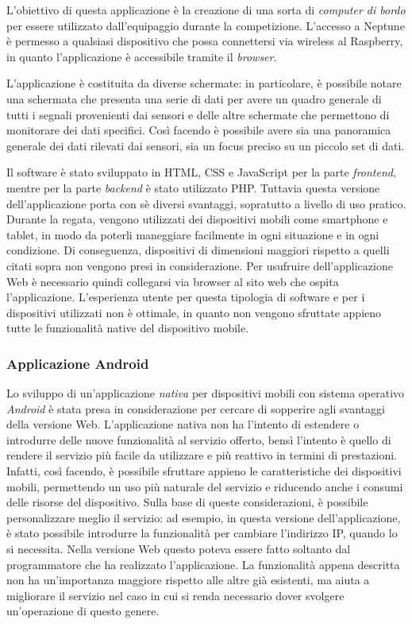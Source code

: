 L'obiettivo di questa applicazione è la creazione di una sorta di \textit{computer di bordo} per essere utilizzato dall'equipaggio durante la competizione. L'accesso a Neptune è permesso a qualsiasi dispositivo che possa connettersi via wireless al Raspberry, in quanto l'applicazione è accessibile tramite il \textit{browser}.

L'applicazione è costituita da diverse schermate: in particolare, è possibile notare una schermata che presenta una serie di dati per avere un quadro generale di tutti i segnali provenienti dai sensori e delle altre schermate che permettono di monitorare dei dati specifici. Così facendo è possibile avere sia una panoramica generale dei dati rilevati dai sensori, sia un focus preciso su un piccolo set di dati.

Il software è stato sviluppato in HTML, CSS e JavaScript per la parte \textit{frontend}, mentre per la parte \textit{backend} è stato utilizzato PHP. Tuttavia questa versione dell'applicazione porta con sè diversi svantaggi, sopratutto a livello di uso pratico. Durante la regata, vengono utilizzati dei dispositivi mobili come smartphone e tablet, in modo da poterli maneggiare facilmente in ogni situazione e in ogni condizione. Di conseguenza, dispositivi di dimensioni maggiori rispetto a quelli citati sopra non vengono presi in considerazione. Per usufruire dell'applicazione Web è necessario quindi collegarsi via browser al sito web che ospita l'applicazione. L'esperienza utente per questa tipologia di software e per i dispositivi utilizzati non è ottimale, in quanto non vengono sfruttate appieno tutte le funzionalità native del dispositivo mobile.

\subsubsection{Applicazione Android}
Lo sviluppo di un'applicazione \textit{nativa} per dispositivi mobili con sistema operativo \textit{Android} è stata presa in considerazione per cercare di sopperire agli svantaggi della versione Web. L'applicazione nativa non ha l'intento di estendere o introdurre delle nuove funzionalità al servizio offerto, bensì l'intento è quello di rendere il servizio più facile da utilizzare e più reattivo in termini di prestazioni. Infatti, così facendo, è possibile sfruttare appieno le caratteristiche dei dispositivi mobili, permettendo un uso più naturale del servizio e riducendo anche i consumi delle risorse del dispositivo.
Sulla base di queste considerazioni, è possibile personalizzare meglio il servizio: ad esempio, in questa versione dell'applicazione, è stato possibile introdurre la funzionalità per cambiare l'indirizzo IP, quando lo si necessita. Nella versione Web questo poteva essere fatto soltanto dal programmatore che ha realizzato l'applicazione. La funzionalità appena descritta non ha un'importanza maggiore rispetto alle altre già esistenti, ma aiuta a migliorare il servizio nel caso in cui si renda necessario dover svolgere un'operazione di questo genere.

